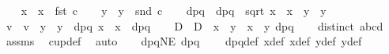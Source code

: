 \begin{isabellebody}
\ \ \isamarkupfalse%
\ x{}\ \ {\isachardoublequoteopen}x{}\ {\isasymequiv}\ fst\ c{\isachardoublequoteclose}\isanewline
\ \ \isamarkupfalse%
\ y{}\ \ {\isachardoublequoteopen}y{}\ {\isasymequiv}\ snd\ c{\isachardoublequoteclose}\isanewline
\ \ \isamarkupfalse%
\ dpq\ \ {\isachardoublequoteopen}dpq\ {\isasymequiv}\ sqrt\ {\isacharparenleft}{\kern0pt}{\isacharparenleft}{\kern0pt}x{}\ {\isacharminus}{\kern0pt}\ x{}{\isacharparenright}{\kern0pt}{\isacharcircum}{\kern0pt}{}\ {\isacharplus}{\kern0pt}\ {\isacharparenleft}{\kern0pt}y{}\ {\isacharminus}{\kern0pt}\ y{}{\isacharparenright}{\kern0pt}{\isacharcircum}{\kern0pt}{}{\isacharparenright}{\kern0pt}{\isachardoublequoteclose}\isanewline
\ \ \isamarkupfalse%
\ v\ \ {\isachardoublequoteopen}v\ {\isasymequiv}\ {\isacharparenleft}{\kern0pt}{\isacharparenleft}{\kern0pt}y{}\ {\isacharminus}{\kern0pt}\ y{}{\isacharparenright}{\kern0pt}\ {\isacharslash}{\kern0pt}\ dpq{\isacharcomma}{\kern0pt}\ {\isacharparenleft}{\kern0pt}x{}\ {\isacharminus}{\kern0pt}\ x{}{\isacharparenright}{\kern0pt}\ {\isacharslash}{\kern0pt}\ dpq{\isacharparenright}{\kern0pt}{\isachardoublequoteclose}\isanewline
\ \ \isamarkupfalse%
\ D\ \ {\isachardoublequoteopen}D\ {\isasymequiv}\ {\isacharparenleft}{\kern0pt}x{}\ {\isacharasterisk}{\kern0pt}\ y{}\ {\isacharminus}{\kern0pt}\ x{}\ {\isacharasterisk}{\kern0pt}\ y{}{\isacharparenright}{\kern0pt}{\isacharslash}{\kern0pt}\ dpq{\isachardoublequoteclose}\isanewline
\ \ \isamarkupfalse%
\ {\isachardoublequoteopen}distinct\ {\isacharbrackleft}{\kern0pt}a{\isacharcomma}{\kern0pt}b{\isacharcomma}{\kern0pt}c{\isacharcomma}{\kern0pt}d{\isacharbrackright}{\kern0pt}{\isachardoublequoteclose}\ \isamarkupfalse%
\ assms\ \isamarkupfalse%
\ cup{\isacharunderscore}{\kern0pt}def\ \isamarkupfalse%
\ auto\isanewline
\ \ \isamarkupfalse%
\ dpqNE{}{\isacharcolon}{\kern0pt}\ {\isachardoublequoteopen}dpq\ {\isachargreater}{\kern0pt}\ {}{\isachardoublequoteclose}\ \isamarkupfalse%
\ dpq{\isacharunderscore}{\kern0pt}def\ x{}{\isacharunderscore}{\kern0pt}def\ x{}{\isacharunderscore}{\kern0pt}def\ y{}{\isacharunderscore}{\kern0pt}def\ y{}{\isacharunderscore}{\kern0pt}def\ \isanewline

\end{isabellebody}
